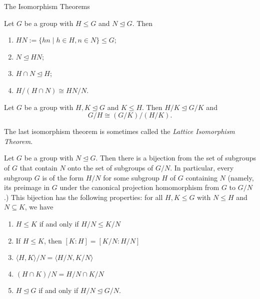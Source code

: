 \begin{section}{The Isomorphism Theorems}
\begin{theorem}
Let $G$ be a group with $H\leq G$ and $N\trianglelefteq G$.  Then
\begin{enumerate}[label=\textrm{(\alph*)}]
\item $HN:=\{hn\mid h\in H, n\in N\}\leq G$;
\item $N\trianglelefteq HN$;
\item $H\cap N\trianglelefteq H$;
\item $\displaystyle H/(H\cap N)\cong HN/N$.
\end{enumerate}
\end{theorem}

\begin{theorem}
Let $G$ be a group with $H,K\trianglelefteq G$ and $K\leq H$.  Then $H/K\trianglelefteq G/K$ and
\[
G/H\cong (G/K)/(H/K).
\]
\end{theorem}

The last isomorphism theorem is sometimes called the \emph{Lattice Isomorphism Theorem}.

\begin{theorem}

Let $G$ be a group with $N\trianglelefteq G$. Then there is a bijection from the set of subgroups of $G$ that contain $N$ onto the set of subgroups of $G/N$. In particular, every subgroup $G$ is of the form $H/N$ for some subgroup $H$ of $G$ containing $N$ (namely, its preimage in $G$ under the canonical projection homomorphism from $G$ to $G/N$.) This bijection has the following properties: for all $H,K \leq G$ with  $N\leq H$ and $N\subseteq K$, we have
\begin{enumerate}[label=\textrm{(\alph*)}]
\item $H\leq K$ if and only if $H/N \leq K/N$
\item If $H\leq K$, then $[K:H]=[K/N:H/N]$
\item $\langle H,K\rangle/N=\langle H/N,K/N\rangle$
\item $(H\cap K)/N=H/N \cap K/N$
\item $H\trianglelefteq G$ if and only if $H/N\trianglelefteq G/N$.
\end{enumerate}
\end{theorem}

\end{section}